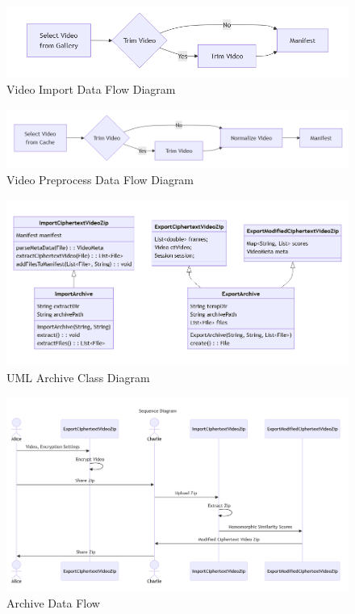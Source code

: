 \documentclass [11pt, proquest] {uwthesis}[2020/02/24]
\begin{document}
\begin{figure}
  \centering
  \includegraphics[width=\textwidth,height=\textheight,keepaspectratio]{Appendix/Figures/videoImport.png}
  \caption{Video Import Data Flow Diagram}
  \label{fig:appendix_videoImportDataFlow}
\end{figure}

\begin{figure}
  \centering
  \includegraphics[width=\textwidth,height=\textheight,keepaspectratio]{Appendix/Figures/videoPreprocess.png}
  \caption{Video Preprocess Data Flow Diagram}
  \label{fig:appendix_videoPreprocessDataFlow}
\end{figure}

\begin{figure}
  \centering
  \includegraphics[width=\textwidth,height=\textheight,keepaspectratio]{Appendix/Figures/shareArchiveClass.png}
  \caption{UML Archive Class Diagram}
  \label{fig:appendix_archiveClass}
\end{figure}

\begin{figure}
  \centering
  \includegraphics[width=\textwidth,height=\textheight,keepaspectratio]{Appendix/Figures/shareArchiveSequence.png}
  \caption{Archive Data Flow}
  \label{fig:appendix_archiveDataFlow}
\end{figure}
\end{document}
